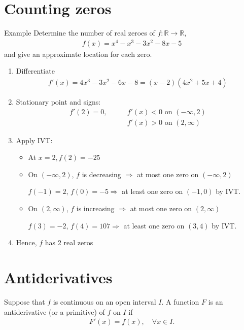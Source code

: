 \documentclass{report}
\begin{document}
	\section{Counting zeros}

		\begin{question}{Example}
			Determine the number of real zeroes of $f: \mathbb{R} \rightarrow \mathbb{R}$,
			\begin{align*}
				f(x) = x^4 - x^3 - 3x^2 - 8x - 5
			\end{align*}
			and give an approximate location for each zero.
			\begin{enumerate}
				\item Differentiate
					\begin{align*}
						f'(x) = 4x^3 - 3x^2 - 6x - 8 = (x-2)(4x^2 + 5x + 4)
					\end{align*}
				\item Stationary point and signs:
					\begin{align*}
						f'(2) = 0, \qquad & f'(x) < 0 \text{ on } (-\infty, 2)	\\
										  & f'(x) > 0 \text{ on } (2, \infty)
					\end{align*}
				\item Apply IVT:
					\begin{itemize}
						\item At $x=2, f(2) = -25$
						\item On $(-\infty,2)$, $f$ is decreasing $\Rightarrow$ at most one zero on $(-\infty,2)$

							\qquad $f(-1) = 2$, $f(0) = -5 \Rightarrow$ at least one zero on $(-1,0)$ by IVT.
						\item On $(2, \infty)$, $f$ is increasing $\Rightarrow$ at most one zero on $(2, \infty)$

							\qquad $f(3) = -2$, $f(4) = 107 \Rightarrow$ at least one zero on $(3,4)$ by IVT.
					\end{itemize}
				\item Hence, $f$ has 2 real zeros
			\end{enumerate}
		\end{question}

	\section{Antiderivatives}

		Suppose that $f$ is continuous on an open interval $I$. A function $F$ is an antiderivative (or a primitive) of $f$ on $I$ if
		\begin{align*}
			F'(x) = f(x), \quad \forall x \in I.
		\end{align*}
\end{document}
